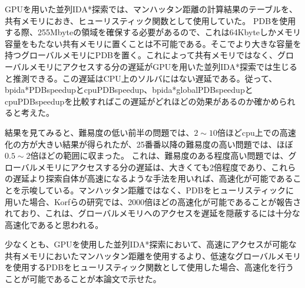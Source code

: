 \documentclass[a4paper,11pt,oneside,openany]{jsbook}
\begin{document}
GPUを用いた並列IDA*探索では、マンハッタン距離の計算結果のテーブルを、共有メモリにおき、ヒューリスティック関数として使用していた。
PDBを使用する際、255Mbyteの領域を確保する必要があるので、これは64Kbyteしかメモリ容量をもたない共有メモリに置くことは不可能である。そこでより大きな容量を持つグローバルメモリにPDBを置く。これによって共有メモリではなく、グローバルメモリにアクセスする分の遅延がGPUを用いた並列IDA*探索では生じると推測できる。この遅延はCPU上のソルバにはない遅延である。従って、bpida*PDBspeedupとcpuPDBspeedup、bpida*globalPDBspeedupとcpuPDBspeedupを比較すればこの遅延がどれほどの効果があるのか確かめられると考えた。

結果を見てみると、難易度の低い前半の問題では、$2\sim10$倍ほどcpu上での高速化の方が大きい結果が得られたが、25番番以降の難易度の高い問題では、ほぼ$0.5\sim2$倍ほどの範囲に収まった。
これは、難易度のある程度高い問題では、グローバルメモリにアクセスする分の遅延は、大きくても2倍程度であり、これらの遅延より探索自体が高速になるような手法を用いれば、高速化が可能であることを示唆している。マンハッタン距離ではなく、PDBをヒューリスティックに用いた場合、Korfらの研究\cite{KF02}では、2000倍ほどの高速化が可能であることが報告されており、これは、グローバルメモリへのアクセスを遅延を隠蔽するには十分な高速化であると思われる。

少なくとも、GPUを使用した並列IDA*探索において、高速にアクセスが可能な共有メモリにおいたマンハッタン距離を使用するより、低速なグローバルメモリを使用するPDBをヒューリスティック関数として使用した場合、高速化を行うことが可能であることが本論文で示せた。



\end{document}
